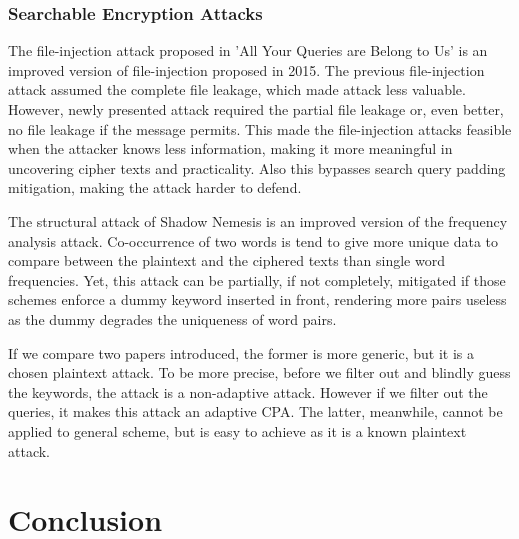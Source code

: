 \documentclass[a4paper]{article}
\begin{document}
\subsubsection{Searchable Encryption Attacks}

The file-injection attack proposed in 'All Your Queries are Belong to Us' is an improved version of file-injection proposed in 2015. The previous file-injection attack assumed the complete file leakage, which made attack less valuable. However, newly presented attack required the partial file leakage or, even better, no file leakage if the message permits. This made the file-injection attacks feasible when the attacker knows less information, making it more meaningful in uncovering cipher texts and practicality. Also this bypasses search query padding mitigation, making the attack harder to defend.
\par The structural attack of Shadow Nemesis is an improved version of the frequency analysis attack. Co-occurrence of two words is tend to give more unique data to compare between the plaintext and the ciphered texts than single word frequencies. Yet, this attack can be partially, if not completely, mitigated if those schemes enforce a dummy keyword inserted in front, rendering more pairs useless as the dummy degrades the uniqueness of word pairs.
\par If we compare two papers introduced, the former is more generic, but it is a chosen plaintext attack. To be more precise, before we filter out and blindly guess the keywords, the attack is a non-adaptive attack. However if we filter out the queries, it makes this attack an adaptive CPA. The latter, meanwhile, cannot be applied to general scheme, but is easy to achieve as it is a known plaintext attack.

\section{Conclusion}
\end{document}
